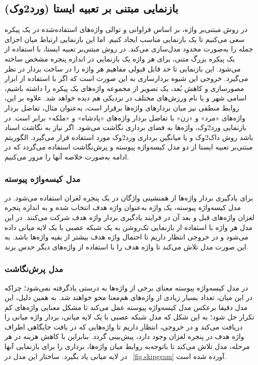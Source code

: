 \subsection{بازنمایی مبتنی ‌بر تعبیه ایستا (ورد2وک)}
در روش مبتنی‌بر واژه،  بر اساس فراوانی و توالی واژه‌های استفاده‌شده در یک پیکره سعی می‌کنیم تا یک بازنمایی مناسب ایجاد کنیم. اما این بازنمایی ارتباط میان اجزای جمله را به‌صورت محدود مدل‌سازی می‌کند. در روش مبتنی‌بر تعبیه ایستا، با استفاده از یک پیکره بزرگ متنی، برای هر واژه یک بازنمایی در اندازه پنجره مشخص ساخته می‌شود. این بازنمایی تا حد قابل قبولی مفاهیم هر واژه را در ساخت بردار در نظر می‌گیرد. خروجی این شیوه بردارسازی به این صورت است که اگر با استفاده از ابزار مصورسازی و کاهش بُعد، یک تصویر از مجموعه واژه‌های یک پیکره را داشته باشیم، اسامی شهر و یا نام ورزش‌های مختلف در نزدیکی هم دیده خواهد شد. علاوه بر این، روابط منطقی نیز میان بردارهای واژه‌ها برقرار است، به‌عنوان مثال، تفاضل بردار واژه‌های «مرد» و «زن» با تفاضل بردار واژه‌های «پادشاه» و «ملکه» برابر است. در بازنمایی ورد2وک، واژه‌ها به فضای برداری نگاشت می‌شود. اگر نیاز به نگاشت اسناد باشد روش داک2وک و یا میانگین برداری ورد2وک مورد استفاده قرار می‌گیرد. الگوریتم مبتنی‌بر تعبیه ایستا از دو مدل کیسه‌واژه پیوسته و پرش‌نگاشت\citep{mikolov2013distributed} استفاده می‌گردد که در ادامه به‌صورت خلاصه آنها را مرور می‌کنیم.

\subsubsection{مدل کیسه‌واژه پیوسته}
برای یادگیری بردار واژه‌ها از همنشینی واژگان در یک پنجره لغزان استفاده می‌شود. در مدل کیسه‌واژه پیوسته، یک واژه به‌عنوان واژه هدف انتخاب شده و به اندازه پنجره لغزان واژه‌های قبل و بعد آن در فرایند یادگیری بردار واژه هدف شرکت می‌کنند. در این مدل هر واژه با استفاده از بازنمایی تک‌روشن به یک شبکه عصبی با یک لایه میانی داده می‌شود و در خروجی انتظار داریم تا احتمال واژه هدف بیشتر از بقیه واژه‌ها باشد. به این صورت مدل  تلاش می‌کند تا واژه هدف را با استفاده از واژه‌های دیگر حدس بزند.

\subsubsection{مدل پرش‌نگاشت}
در مدل کیسه‌واژه پیوسته معنای برخی از واژه‌ها به درستی یادگرفته نمی‌شود؛ چراکه در این میان، تعداد بسیار زیادی از واژه‌های هم‌معنا محو خواهند شد. به همین دلیل، این مدل دقیقا برعکس مدل کیسه‌واژه پیوسته عمل می‌کند تا مشکل معنایی واژه‌های کم تکرار حل شود؛ به این شکل که مدل شبکه عصبی با یک لایه میانی، بردار واژه میانی را دریافت می‌کند و در خروجی، انتظار داریم تا واژه‌هایی که در بافت جایگاهی اطراف واژه هدف در پنجره لغزان وجود دارد، پیش‌بینی گردد. بنابراین با کاهش هزینه در هر مرحله، مدل تلاش می‌کند تا باتوجه‌به روابط میان واژه‌ها، برداری را برای بازنمایی آنها در لایه میانی یاد بگیرد. ساختار این مدل در \figurename~\ref{fig.skipgram} آورده شده ‌است.

